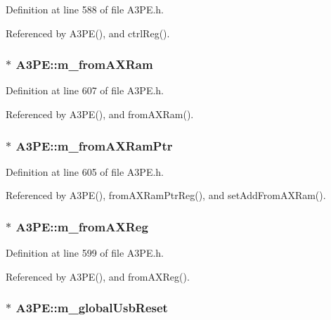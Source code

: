 Definition at line 588 of file A3PE.h.

Referenced by A3PE(), and ctrlReg().\hypertarget{classA3PE_a91d3dd3e87e2c948dd67cb82a63d3858}{
\subsubsection[{m\_\-fromAXRam}]{$\ast$ {\bf A3PE::m\_\-fromAXRam}}}
\label{classA3PE_a91d3dd3e87e2c948dd67cb82a63d3858}


Definition at line 607 of file A3PE.h.

Referenced by A3PE(), and fromAXRam().\hypertarget{classA3PE_a27ae9467bc128e46dd80443245df096a}{
\subsubsection[{m\_\-fromAXRamPtr}]{$\ast$ {\bf A3PE::m\_\-fromAXRamPtr}}}
\label{classA3PE_a27ae9467bc128e46dd80443245df096a}


Definition at line 605 of file A3PE.h.

Referenced by A3PE(), fromAXRamPtrReg(), and setAddFromAXRam().\hypertarget{classA3PE_acbfe708ac0a81243959c96124f192b9e}{
\subsubsection[{m\_\-fromAXReg}]{$\ast$ {\bf A3PE::m\_\-fromAXReg}}}
\label{classA3PE_acbfe708ac0a81243959c96124f192b9e}


Definition at line 599 of file A3PE.h.

Referenced by A3PE(), and fromAXReg().\hypertarget{classA3PE_abd71e0c273f9e211e1a9302019129aff}{
\subsubsection[{m\_\-globalUsbReset}]{$\ast$ {\bf A3PE::m\_\-globalUsbReset}}}
\label{classA3PE_abd71e0c273f9e211e1a9302019129aff}


